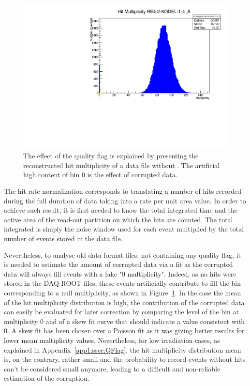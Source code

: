 	\begin{figure}
        \centering
		\includegraphics[width = \linewidth]{fig/app1/No_Qflag_nhits_KODEL.pdf}
		\caption{\label{fig:corrupted} The effect of the quality flag is explained by presenting the reconstructed hit multiplicity of a data file without . The artificial high content of bin 0 is the effect of corrupted data.}
	\end{figure}
		
	The hit rate normalization corresponds to translating a number of hits recorded during the full duration of data taking into a rate per unit area value. In order to achieve such result, it is first needed to know the total integrated time and the active area of the read-out partition on which the hits are counted. The total integrated is simply the noise window used for each event multiplied by the total number of events stored in the data file.
	
	Nevertheless, to analyse old data format files, not containing any quality flag, it is needed to estimate the amount of corrupted data via a fit as the corrupted data will always fill events with a fake "0 multiplicity". Indeed, as no hits were stored in the DAQ ROOT files, these events artificially contribute to fill the bin corresponding to a null multiplicity, as shown in Figure~\ref{fig:corrupted}. In the case the mean of the hit multiplicity distribution is high, the contribution of the corrupted data can easily be evaluated for later correction by comparing the level of the bin at multiplicity 0 and of a skew fit curve that should indicate a value consistent with 0. A skew fit has been chosen over a Poisson fit as it was giving better results for lower mean multiplicity  values. Nevertheless, for low irradiation cases, as explained in Appendix~\ref{app1:ssec:QFlag}, the hit multiplicity distribution mean is, on the contrary, rather small and the probability to record events without hits can't be considered small anymore, leading to a difficult and non-reliable estimation of the corruption.\\
	

